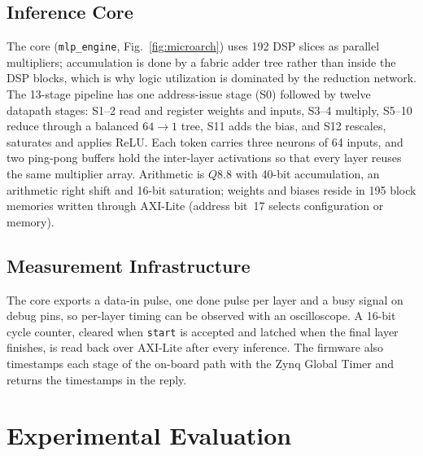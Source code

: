 \documentclass[pdflatex,sn-mathphys-num,iicol]{sn-jnl}
\begin{document}
\subsection{Inference Core}
The core (\texttt{mlp\_engine}, Fig.~\ref{fig:microarch}) uses 192 DSP slices as
parallel multipliers; accumulation is done by a fabric adder tree rather than
inside the DSP blocks, which is why logic utilization is dominated by the
reduction network. The 13-stage pipeline has one address-issue stage (S0)
followed by twelve datapath stages: S1--2 read and register weights and inputs,
S3--4 multiply, S5--10 reduce through a balanced $64\!\rightarrow\!1$ tree, S11
adds the bias, and S12 rescales, saturates and applies ReLU. Each token carries
three neurons of 64 inputs, and two ping-pong buffers hold the inter-layer
activations so that every layer reuses the same multiplier array. Arithmetic is
$Q8.8$ with 40-bit accumulation, an arithmetic right shift and 16-bit
saturation; weights and biases reside in 195 block memories written through
AXI-Lite (address bit~17 selects configuration or memory).

\subsection{Measurement Infrastructure}
The core exports a data-in pulse, one done pulse per layer and a busy signal on
debug pins, so per-layer timing can be observed with an oscilloscope. A 16-bit
cycle counter, cleared when \texttt{start} is accepted and latched when the
final layer finishes, is read back over AXI-Lite after every inference. The
firmware also timestamps each stage of the on-board path with the Zynq Global
Timer and returns the timestamps in the reply.

\section{Experimental Evaluation}
\label{sec:eval}
\end{document}
